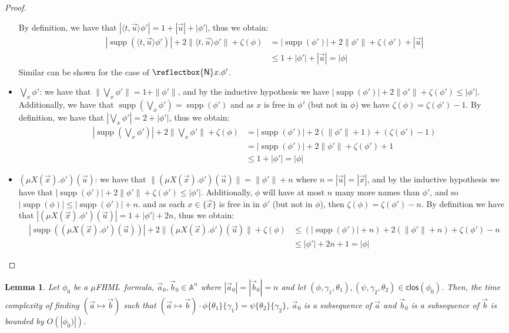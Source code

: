\documentclass[10pt,a4paper]{article}
\newtheorem{lemma}[theorem]{Lemma}
\theoremstyle{definition}
\theoremstyle{remark}
\newcommand\new[0]{\reflectbox{\ensuremath{\mathsf{N}}}}
\newcommand\fresh[1]{\new #1.}
\newcommand\fhml[0]{$\mu$FHML}
\DeclareMathOperator{\supp}{supp}
\newcommand\diam[1]{\langle#1\rangle}
\newcommand\Atoms{\mathbb{A}}
\newcommand{\move}[2]{(#1\mapsto#2)}
\newcommand{\clos}[0]{\mathsf{clos}}
\begin{document}
\begin{proof}
\begin{itemize}
		By definition, we have that $|\diam{t, \vec u} \phi'| = 1 + |\vec u| + |\phi'|$, thus we obtain:
		\begin{align*}
			|\supp(\diam{t, \vec u} \phi')| + 2\|\diam{t, \vec u} \phi'\| + \zeta(\phi) 
			&= |\supp(\phi')| + 2\|\phi'\| + \zeta(\phi') + |\vec u|\\
			&\le 1 + |\phi'| + |\vec u| = |\phi|
		\end{align*}
		Similar can be shown for the case of $\fresh{x}\phi'$.
				\item $\bigvee\nolimits_x \phi'$: we have that $\|\bigvee\nolimits_x \phi'\| = 1 + \|\phi'\|$, and by the inductive hypothesis we have $|\supp(\phi')| + 2\|\phi'\| + \zeta(\phi') \le |\phi'|$.
		Additionally, we have that $\supp(\bigvee\nolimits_x \phi') = \supp(\phi')$ and as $x$ is free in $\phi'$ (but not in $\phi$) we have $\zeta(\phi) = \zeta(\phi') - 1$.
		By definition, we have that $|\bigvee\nolimits_x \phi'| = 2 + |\phi'|$, thus we obtain:
		\begin{align*}
			|\supp(\bigvee\nolimits_x \phi')| + 2\|\bigvee\nolimits_x  \phi'\| + \zeta(\phi) &= |\supp(\phi')| + 2(\|\phi'\| + 1) + (\zeta(\phi') - 1)\\
			&= |\supp(\phi')| + 2\|\phi'\| + \zeta(\phi') + 1\\
			&\le 1 + |\phi'| = |\phi|  
		\end{align*}
				\item $(\mu X(\vec x).\phi')(\vec u)$: we have that $\|(\mu X(\vec x).\phi')(\vec u)\| = \|\phi'\| + n$ where $n = |\vec u| = |\vec x|$, and by the inductive hypothesis we have that $|\supp(\phi')| + 2\|\phi'\| + \zeta(\phi') \le |\phi'|$. 
		Additionally, $\phi$ will have at most $n$ many more names than $\phi'$, and so $|\supp(\phi)| \le |\supp(\phi')| + n$. 
				and as each $x \in \{\vec x\}$ is free in in $\phi'$ (but not in $\phi$), then $\zeta(\phi) = \zeta(\phi') - n$.
		By definition we have that $|(\mu X(\vec x).\phi')(\vec u)| = 1 + |\phi'| + 2n$, thus we obtain:
		\begin{align*}
			|\supp((\mu X(\vec x).\phi')(\vec u))| + 2\|(\mu X(\vec x).\phi')(\vec u)\| + \zeta(\phi)
			&\le (|\supp(\phi')| + n) + 2(\|\phi'\| + n) + \zeta(\phi') - n\\
						&\le |\phi'| + 2n + 1 = |\phi|\ 
		\end{align*}
	\end{itemize}
\end{proof}


\begin{lemma}\label{lem:genPartialPermF}
	Let $\phi_0$ be a \fhml\ formula, $\vec a_0, \vec b_0 \in \Atoms^{n}$ where $|\vec a_0| = |\vec b_0| = n$ and let $(\phi, \gamma_1, \theta_1), (\psi, \gamma_2, \theta_2) \in \clos(\phi_0)$.
	Then, the time complexity of finding $\move{\vec a}{\vec b}$ 
	such that $\move{\vec a}{\vec b} \cdot \phi\{\theta_1\}\{\gamma_1\} = \psi\{\theta_2\}\{\gamma_2\}$, $\vec a_0$ is a subsequence of $\vec a$ and $\vec b_0$ is a subsequence of $\vec b$ is bounded by $O(|\phi_0)|)$.
\end{lemma}
\end{document}

